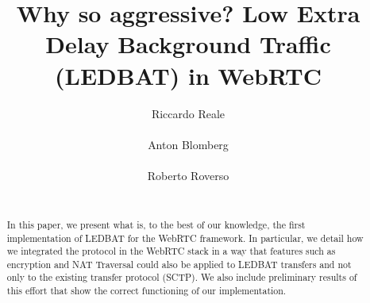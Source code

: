 \documentclass{sig-alternate}
\begin{document}


\title{Why so aggressive? Low Extra Delay Background Traffic (LEDBAT) in WebRTC}


\author{
\alignauthor
Riccardo Reale\\
      \\
\alignauthor
Anton Blomberg\\
      \\
\alignauthor
Roberto Roverso\\
      \\
}

\newcommand{\mysec}[1]{\vspace*{-0.0cm}\section{#1}}
\newcommand{\mysubsec}[1]{\vspace*{-0.0cm}\subsection{#1}\vspace*{0cm}}
\newcommand{\mysubsubsec}[1]{\vspace*{-0.0cm}\subsubsection{#1}\vspace*{0cm}}
\newcommand{\mypar}[1]{\vspace*{-0cm}\paragraph{#1}\vspace*{0cm}}

\maketitle

\begin{abstract}
  In this paper, we present what is, to the best of our knowledge, the first
  implementation of LEDBAT for the WebRTC framework. In particular, we detail how we
  integrated the protocol in the WebRTC stack in a way that features such as encryption
  and NAT Traversal could also be applied to LEDBAT transfers and not only to the existing
  transfer protocol (SCTP). We also include preliminary results of this effort that show
  the correct functioning of our implementation.
\end{abstract}
\end{document}
